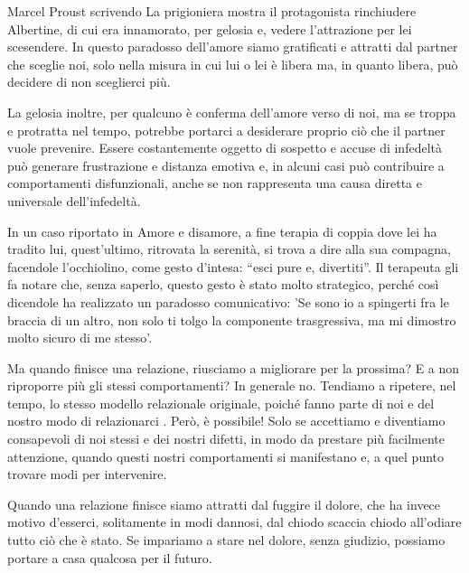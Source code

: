 \documentclass[12pt]{book} %
\begin{document}
\begin{mdframed}[linewidth=1pt]
Marcel Proust scrivendo La prigioniera mostra il protagonista rinchiudere Albertine, di cui era innamorato, per gelosia e, vedere l'attrazione per
lei scesendere. In questo paradosso dell'amore siamo gratificati e attratti dal partner che sceglie noi, solo nella misura in cui lui o lei è libera ma, in quanto libera, può decidere di non sceglierci più.

La gelosia inoltre, per qualcuno è conferma dell'amore verso di noi, ma se troppa e protratta nel
tempo, potrebbe portarci a desiderare proprio ciò che il partner vuole prevenire. Essere costantemente oggetto di sospetto e accuse di infedeltà può generare frustrazione e distanza emotiva e, in alcuni casi può contribuire a comportamenti disfunzionali, anche se non rappresenta una causa diretta e universale dell’infedeltà.

In un caso riportato in Amore e disamore, a fine terapia di coppia dove
lei ha tradito lui, quest'ultimo, ritrovata la serenità, si trova a dire alla sua compagna,
facendole l'occhiolino, come gesto d'intesa: “esci pure e, divertiti”. Il
terapeuta gli fa notare che, senza saperlo, questo gesto è stato molto strategico, perché così dicendole ha realizzato
un paradosso comunicativo: 'Se sono io a spingerti fra le braccia di un altro, non solo ti tolgo
la componente trasgressiva, ma mi dimostro molto sicuro di me stesso'.
\end{mdframed}

Ma quando finisce una relazione, riusciamo a migliorare per la prossima? E a non riproporre più gli stessi comportamenti? In generale no. Tendiamo a ripetere, nel tempo, lo stesso modello relazionale originale, poiché fanno parte di
noi e del nostro modo di relazionarci
. Però, è possibile! Solo se
accettiamo e diventiamo consapevoli di noi stessi e dei nostri difetti, in modo da prestare più facilmente attenzione,
quando questi nostri comportamenti si manifestano e, a quel punto trovare modi per intervenire. 

Quando una relazione finisce siamo attratti dal fuggire il dolore, che ha invece motivo d'esserci,
solitamente in modi dannosi, dal chiodo scaccia chiodo all'odiare tutto ciò che è stato. Se
impariamo a stare nel dolore, senza giudizio, possiamo portare a casa qualcosa per il futuro.
\end{document}
